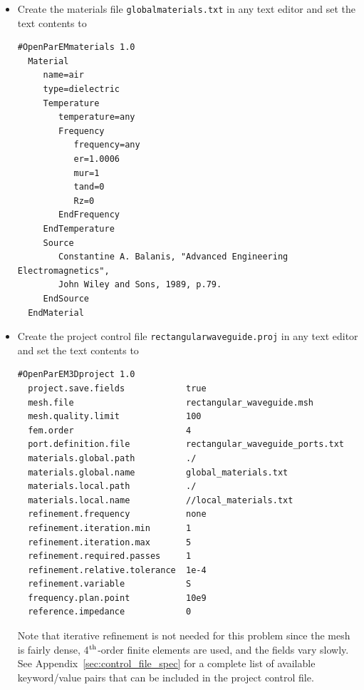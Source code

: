 \documentclass[titlepage]{article}
\renewcommand\_{\textunderscore\linebreak[1]}
\begin{document}
\begin{itemize}

\item Create the materials file \texttt{global\_materials.txt} in any text editor and set the text contents to
\begin{Verbatim}[fontsize=\small]
  #OpenParEMmaterials 1.0
  Material
     name=air
     type=dielectric
     Temperature
        temperature=any
        Frequency
           frequency=any
           er=1.0006
           mur=1
           tand=0
           Rz=0
        EndFrequency
     EndTemperature
     Source
        Constantine A. Balanis, "Advanced Engineering Electromagnetics",
        John Wiley and Sons, 1989, p.79.
     EndSource
  EndMaterial
\end{Verbatim}
\item Create the project control file \texttt{rectangular\_waveguide.proj} in any text editor and set the text contents to
\begin{Verbatim}[fontsize=\small]
  #OpenParEM3Dproject 1.0
  project.save.fields            true
  mesh.file                      rectangular_waveguide.msh
  mesh.quality.limit             100
  fem.order                      4
  port.definition.file           rectangular_waveguide_ports.txt
  materials.global.path          ./
  materials.global.name          global_materials.txt
  materials.local.path           ./
  materials.local.name           //local_materials.txt
  refinement.frequency           none
  refinement.iteration.min       1
  refinement.iteration.max       5
  refinement.required.passes     1
  refinement.relative.tolerance  1e-4
  refinement.variable            S
  frequency.plan.point           10e9
  reference.impedance            0
\end{Verbatim}

\noindent Note that iterative refinement is not needed for this problem since the mesh is fairly dense, 4$^{\textnormal{th}}$-order finite elements are used, and the fields vary slowly.  See Appendix~\ref{sec:control_file_spec} for a complete list of available keyword/value pairs that can be included in the project control file.


\end{itemize}
\end{document}
